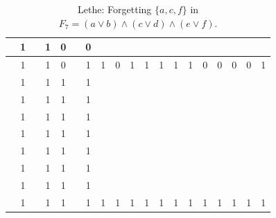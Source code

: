 \begin{table}[!tb]
\begin{tabular}{|c|c|c|c|c|c|c|c|c|c|c|c|c|c|c|c|c|c|c|}
        \rowcolor{blue!40}  & 1 &  & 1 & 0 &  & 0 &  &  &  &  &  &  &  &  &  &  &  &  \\ \hline
        \rowcolor{blue!40}  & 1 &  & 1 & 0 &  & 1 & 1 & 0 & 1 & 1 & 1 & 1 & 1 & 0 & 0 & 0 & 0 & 1 \\ \hline
        \rowcolor{red!40}  & 1 &  & 1 & 1 &  & 1 &  &  &  &  &  &  &  &  &  &  &  &  \\ \hline
        \rowcolor{red!40}  & 1 &  & 1 & 1 &  & 1 &  &  &  &  &  &  &  &  &  &  &  &  \\ \hline
        \rowcolor{red!40}  & 1 &  & 1 & 1 &  & 1 &  &  &  &  &  &  &  &  &  &  &  &  \\ \hline
        \rowcolor{red!40}  & 1 &  & 1 & 1 &  & 1 &  &  &  &  &  &  &  &  &  &  &  &  \\ \hline
        \rowcolor{red!40}  & 1 &  & 1 & 1 &  & 1 &  &  &  &  &  &  &  &  &  &  &  &  \\ \hline
        \rowcolor{red!40}  & 1 &  & 1 & 1 &  & 1 &  &  &  &  &  &  &  &  &  &  &  &  \\ \hline
        \rowcolor{red!40}  & 1 &  & 1 & 1 &  & 1 &  &  &  &  &  &  &  &  &  &  &  &  \\ \hline
        \rowcolor{red!40}  & 1 &  & 1 & 1 &  & 1 & 1 & 1 & 1 & 1 & 1 & 1 & 1 & 1 & 1 & 1 & 1 & 1 \\ \hline
    \end{tabular}
    \caption{Lethe: Forgetting $\{a, c, f\}$ in $F_{7} = (a \lor b) \land (c \lor d) \land (e \lor f)$.}
    \label{tab:lethe-F7-acf}
\end{table}
